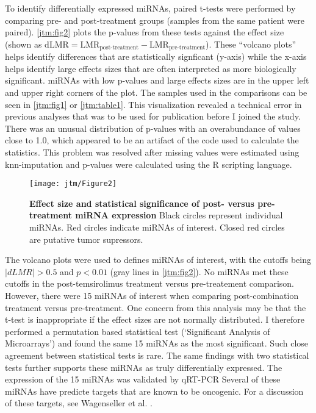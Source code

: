 To identify differentially expressed miRNAs, paired t-tests were
performed by comparing pre- and post-treatment groups (samples from
the same patient were paired). \autoref{jtm:fig2} plots the p-values
from these tests against the effect size (shown as $\text{dLMR} =
\text{LMR}_{\text{post-treatment}} - \text{LMR}_{\text{pre-treatment}}$).
These ``volcano plots'' helps identify differences that are statistically
signficant (y-axis) while the x-axis helps identify large effects sizes
that are often interpreted as more biologically significant. miRNAs with
low p-values and large effects sizes are in the upper left and upper right
corners of the plot. The samples used in the comparisons can be
seen in \autoref{jtm:fig1} or \autoref{jtm:table1}. This visualization revealed
a technical error in previous analyses that was to be used for publication before
I joined the study. There was an unusual distribution of p-values with
an overabundance of values close to 1.0, which appeared to be an artifact of the code used
to calculate the statistics.
This problem was resolved after missing values were 
estimated using knn-imputation and p-values were calculated using 
the R scripting language.

\begin{figure}[h!]
  \centering
  \texttt{[image: jtm/Figure2]}
  \caption[Effect size and statistical significance of post- versus pre-treatment miRNA expression]{
       \textbf{Effect size and statistical significance of post- versus pre-treatment miRNA expression}
       Black circles represent individual miRNAs. Red circles indicate miRNAs of interest. Closed red
       circles are putative tumor supressors.
  }
  \label{jtm:fig2}
\end{figure}

The volcano plots were used to defines miRNAs of interest, with the cutoffs
being $|dLMR|>0.5$ and $p<0.01$ (gray lines in \autoref{jtm:fig2}). 
No miRNAs met these cutoffs in the
post-temsirolimus treatment versus pre-treatement comparison. However,
there were 15 miRNAs of interest when comparing post-combination treatment
versus pre-treatment. One concern from this analysis may be that the t-test
is inappropriate if the effect sizes are not normally distributed. I therefore
performed a permutation based statistical test (`Significant Analysis of Microarrays')
and found the same 15 miRNAs as the most significant. Such close agreement
between statistical tests is rare. The same findings with two statistical tests
further supports these miRNAs as truly differentially expressed.
The expression of the 15 miRNAs was validated by qRT-PCR
Several of these miRNAs have predicte targets that are known
to be oncogenic. For a discussion of these targets, see Wagenseller
et al. \cite{Wagenseller:2013fj}.

